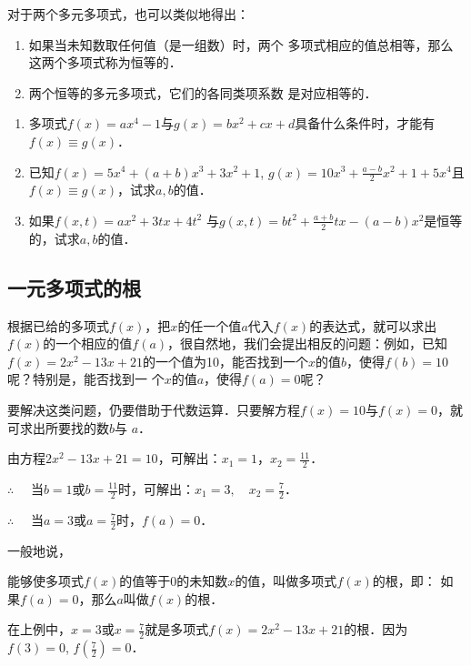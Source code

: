 对于两个多元多项式，也可以类似地得出：
\begin{blk}{}
    \begin{enumerate}
        \item 如果当未知数取任何值（是一组数）时，两个
        多项式相应的值总相等，那么这两个多项式称为恒等的．
        \item 
        两个恒等的多元多项式，它们的各同类项系数
        是对应相等的．
    \end{enumerate}
\end{blk}

\begin{ex}
    \begin{enumerate}
        \item 多项式$f(x)=ax^4-1$与$g(x)=bx^2+cx+d$具备什么条件时，才能有$f(x)\equiv g(x)$．
        \item 已知$f(x)=5x^4+(a+b)x^3+3x^2+1$, $g(x)=10x^3+\frac{a-b}{2}x^2+1+5x^4$且$f(x)\equiv g(x)$，试求$a,b$的值．
        \item 如果$f(x,t)=ax^2+3tx+4t^2$ 与$g(x,t)=bt^2+\frac{a+b}{2}tx-(a-b)x^2$是恒等的，试求$a,b$的值．
    \end{enumerate}
\end{ex}

\subsection{一元多项式的根}

根据已给的多项式$f(x)$，把$x$的任一个值$a$代入$f(x)$的表达式，就可以求出$f(x)$的一个相应的值$f(a)$，很自然地，我们会提出相反的问题：例如，已知$f(x)=2x^2-13x+21$的一个值为10，能否找到一个$x$的值$b$，使得$f(b)=10$呢？特别是，能否找到一
个$x$的值$a$，使得$f(a)=0$呢？

要解决这类问题，仍要借助于代数运算．只要解方程$f(x)=10$与$f(x)=0$，就可求出所要找的数$b$与
$a$．

由方程$2x^2-13x+21=10$，可解出：$x_1=1$，$x_2=\frac{11}{2}$．

$\therefore\quad $ 当$b=1$或$b=\frac{11}{2}$时，可解出：$x_1=3,\quad x_2=\frac{7}{2}$．

$\therefore\quad $ 当$a=3$或$a=\frac{7}{2}$时，$f(a)=0$．

一般地说，
\begin{blk}{}
    能够使多项式$f(x)$的值等于0的未知数$x$的值，叫做多项式$f(x)$的根，即：
如果$f(a)=0$，那么$a$叫做$f(x)$的根．
\end{blk}


在上例中，$x=3$或$x=\frac{7}{2}$就是多项式$f(x)=2x^2-13x+21$的根．因为$f(3)=0$, $f\left(\frac{7}{2}\right) =0$．

